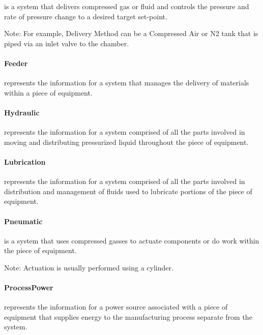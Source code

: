  is a system that delivers compressed gas or fluid and controls the pressure and rate of pressure change to a desired target set-point.

Note: For example, Delivery Method can be a Compressed Air or N2 tank that is piped via an inlet valve to the chamber.


\paragraph{Feeder}\mbox{}
\label{sec:Feeder}


 represents the information for a system that manages the delivery of materials within a piece of equipment.


\paragraph{Hydraulic}\mbox{}
\label{sec:Hydraulic}


 represents the information for a system comprised of all the parts involved in moving and distributing pressurized liquid throughout the piece of equipment.


\paragraph{Lubrication}\mbox{}
\label{sec:Lubrication}


 represents the information for a system comprised of all the parts involved in distribution and management of fluids used to lubricate portions of the piece of equipment.


\paragraph{Pneumatic}\mbox{}
\label{sec:Pneumatic}


 is a system that uses compressed gasses to actuate components or do work within the piece of equipment.

Note: Actuation is usually performed using a cylinder.


\paragraph{ProcessPower}\mbox{}
\label{sec:ProcessPower}


 represents the information for a power source associated with a piece of equipment that supplies energy to the manufacturing process separate from the  system.


